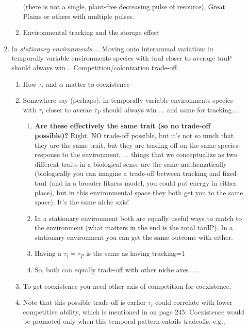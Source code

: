 \documentclass[11pt,letterpaper]{article}
\begin{document}
\begin{enumerate}
\begin{enumerate}
  (there is not a single, plant-free decreasing pulse of resource),
  Great Plains or others with multiple pulses.
\item Environmental tracking and the storage effect
\end{enumerate}
\item In \emph{stationary environments} ...
Moving onto interannual variation: in temporally variable environments species with tauI closer to average tauP should always win... 
Competition/colonization trade-off.
\begin{enumerate}
\item How $\tau_i$ and $\alpha$ matter to coexistence
\item Somewhere say (perhaps): in temporally variable environments species with $\tau_i$ closer to averae $\tau_{P}$ should always win ... and same for tracking....
\begin{enumerate}
\item {\bf Are these effectively the same trait (so no trade-off possible)?} Right, NO trade-off possible, but it's not so much that they are the same trait, but they are trading off on the same species-response to the environment. ... things that we conceptualize as two different traits in a biological sense are the same mathematically (biologically you can imagine a trade-off between tracking and fixed tauI (and in a broader fitness model, you could put energy in either place), but in this environmental space they both get you to the same space). It's the same niche axis!
\item  In a stationary environment both are equally useful ways to match to the environment (what matters in the end is the total tauIP). In a stationary environment you can get the same outcome with either. 
\item Having a $\tau_i = \tau_P$ is the same as having tracking=1
\item So, both can equally trade-off with other niche axes .... 
\end{enumerate}
\item To get coexistence you need other axis of competition for coexistence. \item Note that this possible trade-off is earlier \(\tau_{i}\) could correlate with lower competitive ability, which is mentioned in \citet{Chesson:2004eo} on page 245: Coexistence would be promoted only when this temporal pattern entails tradeoffs, e.g.,

\end{enumerate}
\end{enumerate}
\end{document}
